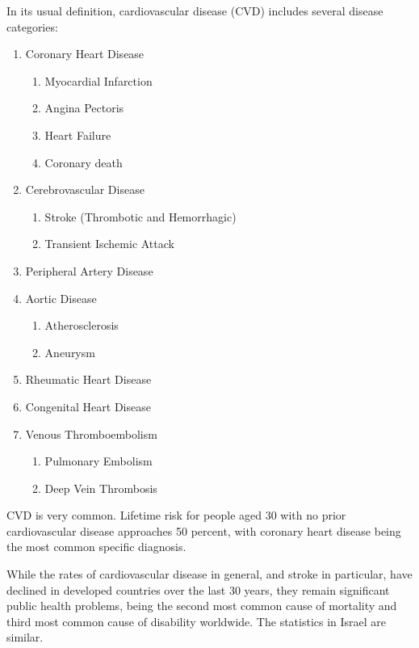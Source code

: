 \documentclass[a4paper,12pt]{article}
\begin{document}
			In its usual definition, cardiovascular disease (CVD) includes several disease categories\cite{WHO2017}:
			\begin{enumerate}
				\item Coronary Heart Disease
				\begin{enumerate}
					\item Myocardial Infarction
					\item Angina Pectoris
					\item Heart Failure
					\item Coronary death
				\end{enumerate}
				\item Cerebrovascular Disease
				\begin{enumerate}
					\item Stroke (Thrombotic and Hemorrhagic)
					\item Transient Ischemic Attack
				\end{enumerate}
				\item Peripheral Artery Disease
				\item Aortic Disease
				\begin{enumerate}
					\item Atherosclerosis
					\item Aneurysm
				\end{enumerate}
				\item Rheumatic Heart Disease
				\item Congenital Heart Disease
				\item Venous Thromboembolism
				\begin{enumerate}
					\item Pulmonary Embolism
					\item Deep Vein Thrombosis
				\end{enumerate}
			\end{enumerate}
		
			CVD is very common. Lifetime risk for people aged 30 with no prior cardiovascular disease approaches 50 percent\cite{Rapsomaniki2014}, with coronary heart disease being the most common specific diagnosis\cite{Benjamin2017}.
	
			While the rates of cardiovascular disease in general, and stroke in particular, have declined in developed countries over the last 30 years\cite{Koton2014,Vangen-Loenne2017}, they remain significant public health problems, being the second most common cause of mortality and third most common cause of disability worldwide\cite{Lozano2012}. The statistics in Israel are similar\cite{ICDC2017}.
			
\end{document}
